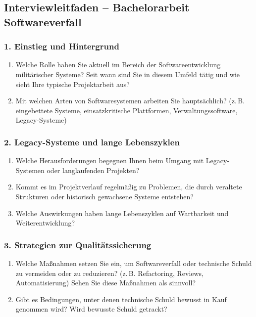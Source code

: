 
\subsection*{Interviewleitfaden – Bachelorarbeit Softwareverfall}

\subsubsection*{1. Einstieg und Hintergrund}

\begin{enumerate}
  \item Welche Rolle haben Sie aktuell im Bereich der Softwareentwicklung militärischer Systeme? Seit wann sind Sie in diesem Umfeld tätig und wie sieht Ihre typische Projektarbeit aus?
  \item Mit welchen Arten von Softwaresystemen arbeiten Sie hauptsächlich? (z.\,B. eingebettete Systeme, einsatzkritische Plattformen, Verwaltungssoftware, Legacy-Systeme)
\end{enumerate}

\subsubsection*{2. Legacy-Systeme und lange Lebenszyklen}

\begin{enumerate}[resume]
  \item Welche Herausforderungen begegnen Ihnen beim Umgang mit Legacy-Systemen oder langlaufenden Projekten?
  \item Kommt es im Projektverlauf regelmäßig zu Problemen, die durch veraltete Strukturen oder historisch gewachsene Systeme entstehen?
  \item Welche Auswirkungen haben lange Lebenszyklen auf Wartbarkeit und Weiterentwicklung?
\end{enumerate}

\subsubsection*{3. Strategien zur Qualitätssicherung}

\begin{enumerate}[resume]
  \item Welche Maßnahmen setzen Sie ein, um Softwareverfall oder technische Schuld zu vermeiden oder zu reduzieren? (z.\,B. Refactoring, Reviews, Automatisierung) Sehen Sie diese Maßnahmen als sinnvoll?
  \item Gibt es Bedingungen, unter denen technische Schuld bewusst in Kauf genommen wird? Wird bewusste Schuld getrackt?
\end{enumerate}

